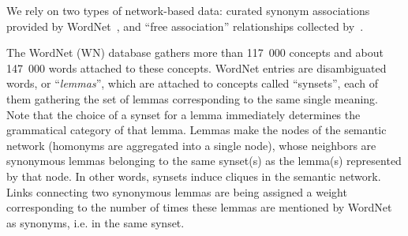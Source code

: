 We rely on two types of network-based data: curated synonym associations provided by WordNet~\citep{WordNet10}, and ``free association'' relationships collected by~\citet{Nelson04}.  

The WordNet (WN) database gathers more than 117~000 concepts and about 147~000 words attached to these concepts. WordNet entries are disambiguated words, or ``\emph{lemmas}'', which are attached to concepts called ``synsets'', each of them gathering the set of lemmas corresponding to the same single meaning. Note that the choice of a synset for a lemma immediately determines the grammatical category of that lemma. Lemmas make the nodes of the semantic network (homonyms are aggregated into a single node), whose neighbors are synonymous lemmas belonging to the same synset(s) as the lemma(s) represented by that node.  In other words, synsets induce cliques in the semantic network. Links connecting two synonymous lemmas are being assigned a weight corresponding to the number of times these lemmas are mentioned by WordNet as synonyms, i.e. in the same synset. 



